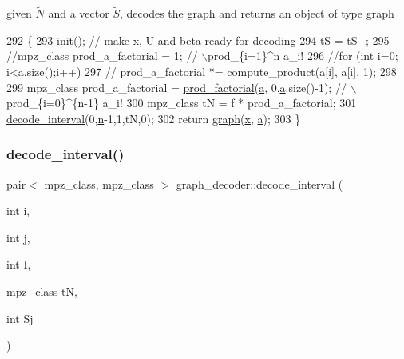 given $\tilde{N}$ and a vector $\tilde{S}$, decodes the graph and returns an object of type graph 


\begin{DoxyCode}
292 \{
293   \hyperlink{classgraph__decoder_a97a9dcd5af21ece86fa91adcb41ca9cc}{init}(); \textcolor{comment}{// make x, U and beta ready for decoding }
294   \hyperlink{classgraph__decoder_ac466636b9b21122f4fa0246aa624978c}{tS} = tS\_;
295   \textcolor{comment}{//mpz\_class prod\_a\_factorial = 1; // \(\backslash\)prod\_\{i=1\}^n a\_i!}
296   \textcolor{comment}{//for (int i=0; i<a.size();i++)}
297   \textcolor{comment}{//  prod\_a\_factorial *= compute\_product(a[i], a[i], 1);}
298 
299   mpz\_class prod\_a\_factorial = \hyperlink{compression__helper_8cpp_a86d8a20e022dc06b23df3b08ac10b7d1}{prod\_factorial}(\hyperlink{classgraph__decoder_a9dd7c3c11b8a45a12cb7c3c2d2bfa2cc}{a}, 0,\hyperlink{classgraph__decoder_a9dd7c3c11b8a45a12cb7c3c2d2bfa2cc}{a}.size()-1); \textcolor{comment}{// \(\backslash\)prod\_\{i=0\}^\{n-1\} a\_i!}
300   mpz\_class tN = f * prod\_a\_factorial;
301   \hyperlink{classgraph__decoder_a2cb0bd279889a833d4c825e99eb72410}{decode\_interval}(0,\hyperlink{classgraph__decoder_a6bc1e72b2f7a913d14b789a6c2d92c1e}{n}-1,1,tN,0);
302   \textcolor{keywordflow}{return} \hyperlink{classgraph}{graph}(\hyperlink{classgraph__decoder_aa3f2776afe387668cf7f68109428e14e}{x}, \hyperlink{classgraph__decoder_a9dd7c3c11b8a45a12cb7c3c2d2bfa2cc}{a});
303 \}
\end{DoxyCode}
\mbox{\label{classgraph__decoder_a2cb0bd279889a833d4c825e99eb72410}} 
\subsubsection{\texorpdfstring{decode\+\_\+interval()}{decode\_interval()}}
{\footnotesize\ttfamily pair$<$ mpz\+\_\+class, mpz\+\_\+class $>$ graph\+\_\+decoder\+::decode\+\_\+interval (\begin{DoxyParamCaption}\item[{int}]{i,  }\item[{int}]{j,  }\item[{int}]{I,  }\item[{mpz\+\_\+class}]{tN,  }\item[{int}]{Sj }\end{DoxyParamCaption})}



